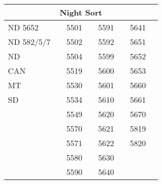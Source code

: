 \documentclass{article}
\begin{document}
\Large
\begin{tabular}[t]{llllllll}
\multicolumn{8}{c}{\textbf{Night Sort}}                                          \\ 
\toprule
ND 5652    & \cellcolor{green}  & 5501 & \cellcolor{yellow} & 5591 & \cellcolor{yellow} & 5641 & \cellcolor{yellow} \\
ND 582/5/7 & \cellcolor{blue}   & 5502 & \cellcolor{purple} & 5592 & \cellcolor{yellow} & 5651 & \cellcolor{blue}   \\
ND         & \cellcolor{grey}   & 5504 & \cellcolor{yellow} & 5599 & \cellcolor{orange} & 5652 & \cellcolor{green}  \\
CAN        & \cellcolor{blue}   & 5519 & \cellcolor{grey}   & 5600 & \cellcolor{blue}   & 5653 & \cellcolor{green}  \\
MT         & \cellcolor{grey}   & 5530 & \cellcolor{purple} & 5601 & \cellcolor{blue}   & 5660 & \cellcolor{green}  \\
SD         & \cellcolor{purple} & 5534 & \cellcolor{purple} & 5610 & \cellcolor{blue}   & 5661 & \cellcolor{green}  \\
           &                    & 5549 & \cellcolor{red}    & 5620 & \cellcolor{yellow} & 5670 & \cellcolor{blue}   \\
           &                    & 5570 & \cellcolor{green}  & 5621 & \cellcolor{purple} & 5819 & \cellcolor{blue}   \\
           &                    & 5571 & \cellcolor{green}  & 5622 & \cellcolor{blue}   & 5820 & \cellcolor{blue}   \\
           &                    & 5580 & \cellcolor{green}  & 5630 & \cellcolor{blue}   &      &                    \\
           &                    & 5590 & \cellcolor{yellow} & 5640 & \cellcolor{blue}   &      &                    \\ \bottomrule
\end{tabular}
\hspace{1em}
\large
\end{document}
